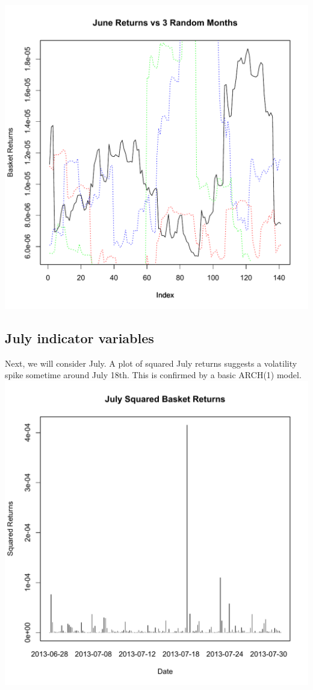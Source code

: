 \documentclass[11pt]{amsart}
\begin{document}
\includegraphics[scale=0.7]{june_3_months.pdf} \\

\newpage
\subsection{July indicator variables}
Next, we will consider July. A plot of squared July returns suggests a volatility spike sometime around July 18th. This is confirmed by a basic ARCH(1) model. \\

\includegraphics[scale=0.6]{july_squared_basket_ret.pdf} \\
\end{document}

